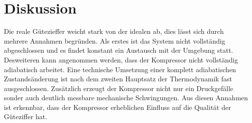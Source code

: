 \section{Diskussion}
\label{sec:Diskussion}
Die reale Gütezieffer weicht stark von der idealen ab, dies lässt sich durch mehrere Annahmen begründen.
Als erstes ist das System nicht vollständig abgeschlossen und es findet konstant ein Austausch mit der Umgebung statt.
Desweiteren kann angenommen werden, dass der Kompressor nicht vollständig adiabatisch arbeitet.
Eine technische Umsetzung einer komplett adiabatischen Zustandsänderung ist nach dem zweiten Hauptsatz der Thermodynamik fast ausgeschlossen.
Zusätzlich erzeugt der Kompressor nicht nur ein Druckgefälle sonder auch deutlich messbare mechanische Schwingungen.
Aus diesen Annahmen ist erkennbar, dass der Kompressor erheblichen Einfluss auf die Qualität der Güteziffer hat.
